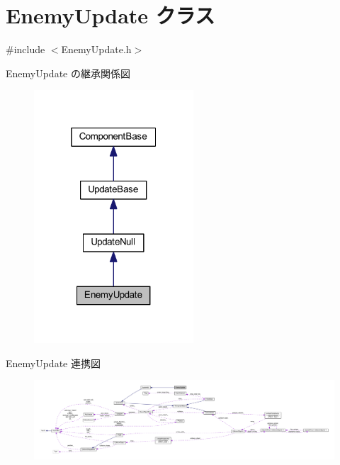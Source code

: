 \hypertarget{class_enemy_update}{}\section{Enemy\+Update クラス}
\label{class_enemy_update}


{\ttfamily \#include $<$Enemy\+Update.\+h$>$}



Enemy\+Update の継承関係図\nopagebreak
\begin{figure}[H]
\begin{center}
\leavevmode
\includegraphics[width=169pt]{class_enemy_update__inherit__graph}
\end{center}
\end{figure}


Enemy\+Update 連携図\nopagebreak
\begin{figure}[H]
\begin{center}
\leavevmode
\includegraphics[width=350pt]{class_enemy_update__coll__graph}
\end{center}
\end{figure}
